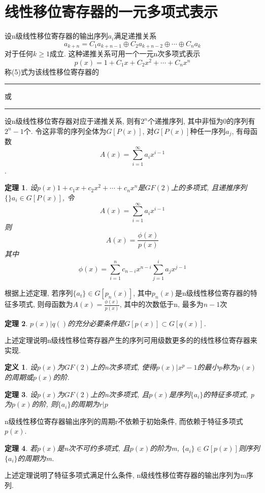 \documentclass[UTF8]{ctexart}
\newcommand\hl{\bgroup\markoverwith
  {\textcolor{yellow}{\rule[-.5ex]{2pt}{2.5ex}}}\ULon}
\newtheorem{theorem}{\hspace{2em}定理}[section]
\newtheorem{definition}{\hspace{2em}定义}[section]
\begin{document}
  \section{线性移位寄存器的一元多项式表示}
  设n级线性移位寄存器的输出序列${a_i}$满足递推关系
  \begin{equation}
    a_{k+n}=C_1a_{k+n-1}\oplus C_2a_{k+n-2}\oplus \cdots \oplus C_na_k
  \end{equation}
  对于任何$k\ge 1$成立. 这种递推关系可用一个一元n次多项式表示
  \begin{equation}
    p(x)=1+C_1x+C_2x^2+\cdots +C_nx^n
  \end{equation}
  称(5)式为该线性移位寄存器的\hl{联系多项式}或\hl{特征多项式}

  设n级线性移位寄存器对应于递推关系, 则有$2^n$个递推序列, 其中非恒为0的序列有$2^n-1$个. 令这非零的序列全体为$G[P(x)]$, 对$G[P(x)]$种任一序列$a_j$, 有母函数
  $$A(x)=\sum\limits_{i=1}^\infty a_i x^{i-1}$$.

  \begin{theorem}
    设$p(x)1+c_1x+c_2x^2+\cdots +c_nx^n$是$GF(2)$上的多项式, 且递推序列$\{\}a_i\in G[P(x)]$, 令
    $$A(x)=\sum\limits_{i=1}^\infty a_i x^{i-1}$$
    则
    $$A(x)=\frac{\phi(x)}{p(x)}$$
    其中
    $$\phi(x)=\sum\limits_{i=1}^n c_{n-i}x^{n-i}\sum\limits_{j=1}^i a_jx^{j-1}$$
  \end{theorem}
  根据上述定理, 若序列$\{a_t\}\in G[p_n(x)]$, 其中$p_n(x)$是n级线性移位寄存器的特征多项式, 则母函数为$A(x)=\frac{\phi(x)}{p(x)}$, 其中的次数低于n, 最多为$n-1$次
  \begin{theorem}
    $p(x)|q()$的充分必要条件是$G[p(x)]\subset G[q(x)]$.
  \end{theorem}
  上述定理说明n级线性移位寄存器产生的序列可用级数更多的的线性移位寄存器来实现.

  \begin{definition}
    设$p(x)$为$GF(2)$上的n次多项式, 使得$p(x)|x^p-1$的最小p称为$p(x)$的周期或$p(x)$的阶.
  \end{definition}

  \begin{theorem}
    设$p(x)$为$GF(2)$上的n次多项式, 且$p(x)$是序列$\{a_i\}$的特征多项式, p为$p(x)$的阶, 则$\{a_i\}$的周期为$r|p$
  \end{theorem}
  n级线性移位寄存器输出序列的周期r不依赖于初始条件, 而依赖于特征多项式$p(x)$.

  \begin{theorem}
    若$p(x)$是n次不可约多项式, 且$p(x)$的阶为m, $\{a_i\}\in G[p(x)]$则序列$\{a_i\}$的周期为m.
  \end{theorem}
  上述定理说明了特征多项式满足什么条件, n级线性移位寄存器的输出序列为m序列.
\end{document}
